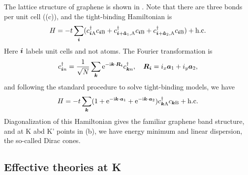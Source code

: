 \documentclass[hyperref, a4paper]{article}
\newcommand*{\ii}{\mathrm{i}}
\newcommand*{\ee}{\mathrm{e}}
\begin{document}
The lattice structure of graphene is shown in .
Note that there are three bonds per unit cell ((c)),
and the tight-binding Hamiltonian is 
\begin{equation}
    H = - t \sum_{\vb*{i}}(
        c^\dagger_{\vb*{i} \text{A}} c_{\vb*{i} \text{B}}
        + c^\dagger_{\vb*{i} + \vu*{a}_1, \text{A}} c_{\vb*{i} \text{B}}
        + c^\dagger_{\vb*{i} + \vu*{a}_2, \text{A}} c_{\vb*{i} \text{B}}
    ) + \text{h.c.}
\end{equation}
Here $\vb*{i}$ labels unit cells and not atoms.
The Fourier transformation is 
\begin{equation}
    c^\dagger_{\vb*{i} n} = \frac{1}{\sqrt{N}} \sum_{\vb*{k}} \ee^{- \ii \vb*{k} \cdot \vb*{R}_{\vb*{i}}} c^\dagger_{\vb*{k} n}, \quad 
    \vb*{R}_{\vb*{i}} = i_x \vb*{a}_1 + i_y \vb*{a}_2,
\end{equation}
and following the standard procedure to solve tight-binding models, we have 
\begin{equation}
    H = - t \sum_{\vb*{k}} 
    (1 + \ee^{- \ii \vb*{k} \cdot \vb*{a}_1} + \ee^{- \ii \vb*{k} \cdot \vb*{a}_2}) 
    c^\dagger_{\vb*{k} \text{A}} c_{\vb*{k} \text{B}} + \text{h.c.}
    \label{eq:full-tb-ham}
\end{equation}
Diagonalization of this Hamiltonian gives the familiar graphene band structure,
and at K abd K' points in (b),
we have energy minimum and linear dispersion,
the so-called Dirac cones.

\subsection{Effective theories at K}
\end{document}
